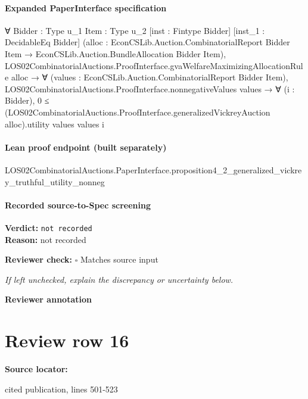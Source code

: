 \documentclass[10pt]{article}
\newcommand{\reviewerbox}{%
  \par\noindent\fbox{\parbox{0.96\linewidth}{\rule{0pt}{0.38in}}}\par
}
\newcommand{\reviewmatch}[1]{%
  \par\noindent\textbf{Reviewer check:} $\square$\; #1\par
  \noindent\emph{If left unchecked, explain the discrepancy or uncertainty below.}\par
}
\begin{document}
\paragraph{Expanded PaperInterface specification}
\begin{ReviewVerbatim}
∀ {Bidder : Type u_1} {Item : Type u_2} [inst : Fintype Bidder] [inst_1 : DecidableEq Bidder]
  (alloc : EconCSLib.Auction.CombinatorialReport Bidder Item → EconCSLib.Auction.BundleAllocation Bidder Item),
  LOS02CombinatorialAuctions.ProofInterface.gvaWelfareMaximizingAllocationRule alloc →
    ∀ (values : EconCSLib.Auction.CombinatorialReport Bidder Item),
      LOS02CombinatorialAuctions.ProofInterface.nonnegativeValues values →
        ∀ (i : Bidder),
          0 ≤ (LOS02CombinatorialAuctions.ProofInterface.generalizedVickreyAuction alloc).utility values values i
\end{ReviewVerbatim}

\paragraph{Lean proof endpoint (built separately)}\begin{ReviewVerbatim}
LOS02CombinatorialAuctions.PaperInterface.proposition4_2_generalized_vickrey_truthful_utility_nonneg
\end{ReviewVerbatim}

\paragraph{Recorded source-to-Spec screening}
\textbf{Verdict:} \texttt{not recorded}
\\
\textbf{Reason:} not recorded
\reviewmatch{Matches source input}
\noindent\textbf{Reviewer annotation}\par
\reviewerbox
\clearpage
\hypertarget{source-claim-86646cd0d0215b44}{}
\section*{Review row 16}
\textbf{Source locator:} {\footnotesize\raggedright cited publication, lines 501-\allowbreak{}523\par}
\end{document}

